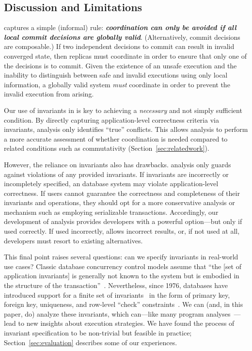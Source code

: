 \subsection{Discussion and Limitations}
\label{sec:theory-discussion}

\iconfluence captures a simple (informal) rule:
\textbf{\textit{coordination can only be avoided if all local commit
    decisions are globally valid}}. (Alternatively, commit decisions
are composable.) If two independent decisions to commit can result in
invalid converged state, then replicas must coordinate in order to
ensure that only one of the decisions is to commit. Given the
existence of an unsafe execution and the inability to distinguish
between safe and invalid executions using only local information, a
globally valid system \textit{must} coordinate in order to prevent the
invalid execution from arising.

 Our use of invariants in \iconfluence is
key to achieving a \textit{necessary} and not simply sufficient
condition. By directly capturing application-level correctness
criteria via invariants, \iconfluence analysis only identifies
``true'' conflicts. This allows \iconfluence analysis to perform a
more accurate assessment of whether coordination is needed compared to
related conditions such as commutativity
(Section~\ref{sec:relatedwork}).

However, the reliance on invariants also has drawbacks. \iconfluence
analysis only guards against violations of any provided invariants. If
invariants are incorrectly or incompletely specified, an \iconfluent
database system may violate application-level correctness. If users
cannot guarantee the correctness and completeness of their invariants
and operations,
they should opt for a more conservative analysis or mechanism such as
employing serializable transactions. Accordingly, our development of
\iconfluence analysis provides developers with a powerful option---but
only if used correctly. If used incorrectly, \iconfluence allows
incorrect results, or, if not used at all, developers must resort to existing alternatives.

This final point raises several questions: can we specify invariants
in real-world use cases? Classic database concurrency control models
assume that ``the [set of application invariants] is generally not
known to the system but is embodied in the structure of the
transaction''~\cite{traiger-tods,eswaran-consistency}. Nevertheless,
since 1976, databases have introduced support for a finite set of
invariants~\cite{korth-serializability,decomp-semantics,garciamolina-semantics,ic-survey,ic-survey-two}
in the form of primary key, foreign key, uniqueness, and row-level
``check'' constraints~\cite{kemme-si-ic}. We can (and, in this paper,
do) analyze these invariants, which can---like many program
analyses~\cite{kohler-commutativity}---lead to new insights about
execution strategies. We have found the process of invariant
specification to be non-trivial but feasible in practice;
Section~\ref{sec:evaluation} describes some of our experiences.

